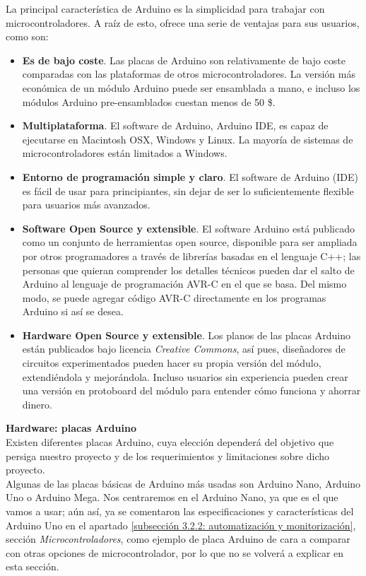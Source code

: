 \documentclass[12pt]{article}
\begin{document}
	\noindent La principal característica de Arduino es la simplicidad para trabajar con microcontroladores. A raíz de esto, ofrece una serie de ventajas para sus usuarios, como son:
	\begin{itemize}
		\item \textbf{Es de bajo coste}. Las placas de Arduino son relativamente de bajo coste comparadas con las plataformas de otros microcontroladores. La versión más económica de un módulo Arduino puede ser ensamblada a mano, e incluso los módulos Arduino pre-ensamblados cuestan menos de 50 \$.
		\item \textbf{Multiplataforma}. El software de Arduino, Arduino IDE, es capaz de ejecutarse en Macintosh OSX, Windows y Linux. La mayoría de sistemas de microcontroladores están limitados a Windows.
		\item  	\textbf{Entorno de programación simple y claro}. El software de Arduino (IDE) es fácil de usar para principiantes, sin dejar de ser lo suficientemente flexible para usuarios más avanzados.
		\item \textbf{Software Open Source y extensible}. El software Arduino está publicado como un conjunto de herramientas open source, disponible para ser ampliada por otros programadores a través de librerías basadas en el lenguaje C++; las personas que quieran comprender los detalles técnicos pueden dar el salto de Arduino al lenguaje de programación AVR-C en el que se basa. Del mismo modo, se puede agregar código AVR-C directamente en los  programas Arduino si así se desea.
		\item \textbf{Hardware Open Source y extensible}. Los planos de las placas Arduino están publicados bajo licencia \textit{Creative Commons}, así pues, diseñadores de circuitos experimentados pueden hacer su propia versión del módulo, extendiéndola y mejorándola. Incluso usuarios sin experiencia pueden crear una versión en protoboard del módulo para entender cómo funciona y ahorrar dinero.
	
	\end{itemize}

	\pagebreak

	\noindent \textbf{Hardware: placas Arduino} \\
	
	\noindent Existen diferentes placas Arduino, cuya elección dependerá del objetivo que persiga nuestro proyecto y de los requerimientos y limitaciones sobre dicho proyecto. \\
	
	\noindent Algunas de las placas básicas de Arduino más usadas son Arduino Nano, Arduino Uno o Arduino Mega. Nos centraremos en el Arduino Nano, ya que es el que vamos a usar; aún así, ya se comentaron las especificaciones y características del Arduino Uno en el apartado \ref{subsección 3.2.2: automatización y monitorización}, sección \textit{Microcontroladores}, como ejemplo de placa Arduino de cara a comparar con otras opciones de microcontrolador, por lo que no se volverá a explicar en esta sección.  \\
	
\end{document}
